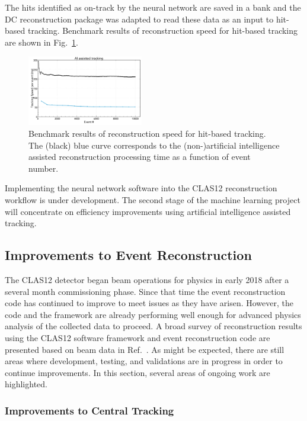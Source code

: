 The hits identified as on-track by the neural network are saved in a bank and the DC reconstruction package was
adapted to read these data as an input to hit-based tracking. Benchmark results of reconstruction speed for
hit-based tracking are shown in Fig.~\ref{fig:nn2}.

\begin{figure}
\centering
\includegraphics[width=0.45\textwidth]{pics/nn2.png}
\caption{Benchmark results of reconstruction speed for hit-based tracking. The (black) blue curve corresponds to
  the (non-)artificial intelligence assisted reconstruction processing time as a function of event number.}
\label{fig:nn2}
\end{figure}

Implementing the neural network software into the CLAS12 reconstruction workflow is under development.
The second stage of the machine learning project will concentrate on efficiency improvements using artificial
intelligence assisted tracking.

\subsection{Improvements to Event Reconstruction}

The CLAS12 detector began beam operations for physics in early 2018 after a several month commissioning
phase. Since that time the event reconstruction code has continued to improve to meet issues as they have
arisen. However, the code and the framework are already performing well enough for advanced physics
analysis of the collected data to proceed. A broad survey of reconstruction results using the CLAS12
software framework and event reconstruction code are presented based on beam data in Ref.~\cite{clas12-nim}.
As might be expected, there are still areas where development, testing, and validations are in progress in
order to continue improvements. In this section, several areas of ongoing work are highlighted.

\subsubsection{Improvements to Central Tracking}

